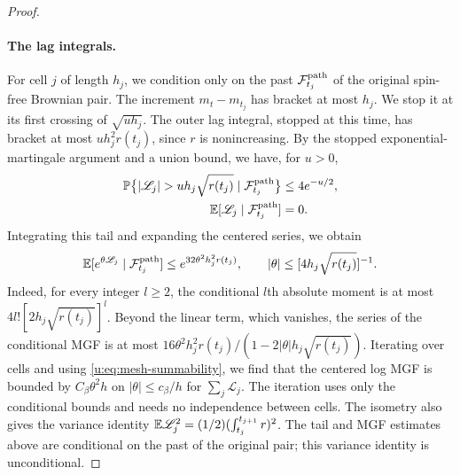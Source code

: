 \begin{proof}
\paragraph{The lag integrals.}
For cell $j$ of length $h_j$, we condition only on the past $\mathcal F_{t_j}^{\rm path}$ of the original spin-free Brownian pair. The increment $m_t-m_{t_j}$ has bracket at most $h_j$. We stop it at its first crossing of $\sqrt{uh_j}$. The outer lag integral, stopped at this time, has bracket at most $uh_j^2r(t_j)$, since $r$ is nonincreasing. By the stopped exponential-martingale argument
\cite[Section~3.5]{karatzas-shreve-1991} and a union bound, we have, for $u>0$,
\begin{equation}\label{u:eq:lag-cell-tail}
\begin{aligned}
 \PP\bigl\{|\mathscr L_j|>uh_j\sqrt{r(t_j)}
                  \mid\mathcal F_{t_j}^{\rm path}\bigr\}&\le4e^{-u/2},\\
 \E[\mathscr L_j\mid\mathcal F_{t_j}^{\rm path}]&=0.
\end{aligned}
\end{equation}
Integrating this tail and expanding the centered series, we obtain
\begin{equation}\label{u:eq:lag-cell-mgf}
 \mathbb E[e^{\theta\mathscr L_j}\mid\mathcal F_{t_j}^{\rm path}]
 \le e^{32\theta^2h_j^2r(t_j)},\qquad
 |\theta|\le[4h_j\sqrt{r(t_j)}]^{-1}.
\end{equation}
Indeed, for every integer $l\ge2$, the conditional $l$th absolute moment is at most $4l![2h_j\sqrt{r(t_j)}]^l$. Beyond the linear term, which vanishes, the series of the conditional MGF is at most $16\theta^2h_j^2r(t_j)/(1-2|\theta|h_j\sqrt{r(t_j)})$.
Iterating over cells and using \eqref{u:eq:mesh-summability}, we find that the centered log MGF is bounded by $C_\beta\theta^2h$ on $|\theta|\le c_\beta/h$ for $\sum_j\mathscr L_j$. The iteration uses only the conditional bounds and needs no independence between cells. The isometry also gives the variance identity $\mathbb E\mathscr L_j^2=(1/2)(\int_{t_j}^{t_{j+1}}r)^2$.
The tail and MGF estimates above are conditional on the past of the original pair; this variance identity is unconditional.


\end{proof}
